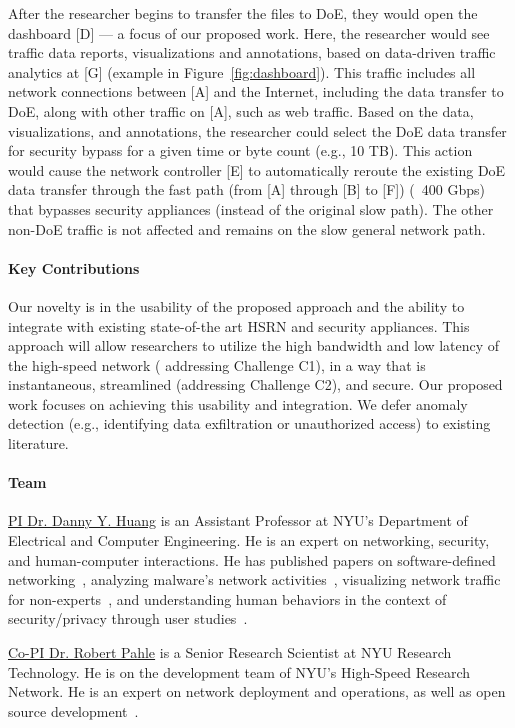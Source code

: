 After the researcher begins to transfer the files to DoE, they would open the dashboard [D] — a focus of our proposed work. Here, the researcher would see traffic data reports, visualizations and annotations, based on data-driven traffic analytics at [G] (example in Figure~\ref{fig:dashboard}). This traffic includes all network connections between [A] and the Internet, including the data transfer to DoE, along with other traffic on [A], such as web traffic. Based on the data, visualizations, and annotations, the researcher could select the DoE data transfer for security bypass for a given time or byte count (e.g., 10 TB). This action would cause the network controller [E] to automatically reroute  the existing DoE data transfer through the fast path (from [A] through [B] to [F]) (~400 Gbps) that bypasses security appliances (instead of the original slow path). The other non-DoE traffic is not affected and remains on the slow general network path.

\paragraph{Key Contributions}
Our novelty is in the usability of the proposed approach and the ability to integrate with existing state-of-the art HSRN and security appliances. This approach will allow researchers to utilize the high bandwidth and low latency of the high-speed network ( addressing Challenge C1), in a way that is instantaneous, streamlined (addressing Challenge C2), and secure. Our proposed work focuses on achieving this usability and integration. We defer anomaly detection (e.g., identifying data exfiltration or unauthorized access) to existing literature.

\paragraph{Team}
\underline{PI Dr. Danny Y. Huang} is an Assistant Professor at NYU's Department of Electrical and Computer Engineering. He is an expert on networking, security, and human-computer interactions. He has published papers on software-defined networking~\cite{huang2013high}, analyzing malware's network activities~\cite{huang2018tracking}, visualizing network traffic for non-experts~\cite{huang2020iot,thakkar2022would}, and understanding human behaviors in the context of security/privacy through user studies~\cite{major2021alexa,thakkar2022would,cruz2023augmented}.

\underline{Co-PI Dr. Robert Pahle} is a Senior Research Scientist at NYU Research Technology. He is on the development team of NYU's High-Speed Research Network. He is an expert on network deployment and operations, as well as open source development~\cite{corelink}.

